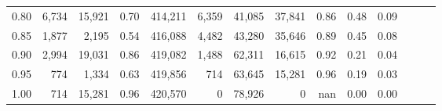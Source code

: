 \begin{tabular}{rrrrrrrrrrrrrr}
0.80 &   6,734 &  15,921 &  0.70 &  414,211 &    6,359 &  41,085 &  37,841 &  0.86 &  0.48 &      0.09 \\
0.85 &   1,877 &   2,195 &  0.54 &  416,088 &    4,482 &  43,280 &  35,646 &  0.89 &  0.45 &      0.08 \\
0.90 &   2,994 &  19,031 &  0.86 &  419,082 &    1,488 &  62,311 &  16,615 &  0.92 &  0.21 &      0.04 \\
0.95 &     774 &   1,334 &  0.63 &  419,856 &      714 &  63,645 &  15,281 &  0.96 &  0.19 &      0.03 \\
1.00 &     714 &  15,281 &  0.96 &  420,570 &        0 &  78,926 &       0 &   nan &  0.00 &      0.00 \\
\bottomrule
\end{tabular}
